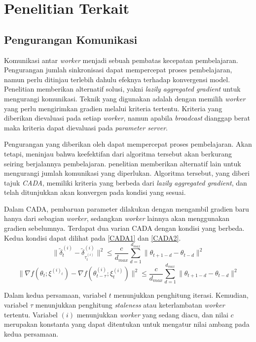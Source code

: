\section{Penelitian Terkait}

\subsection{Pengurangan Komunikasi}
Komunikasi antar \emph{worker} menjadi sebuah pembatas kecepatan pembelajaran. Pengurangan jumlah sinkronisasi dapat mempercepat proses pembelajaran, namun perlu ditinjau terlebih dahulu efeknya terhadap konvergensi model. Penelitian \textcite{Chen2018LAG} memberikan alternatif solusi, yakni \emph{lazily aggregated gradient} untuk mengurangi komunikasi. Teknik yang digunakan adalah dengan memilih \emph{worker} yang perlu mengirimkan gradien melalui kriteria tertentu. Kriteria yang diberikan dievaluasi pada setiap \emph{worker}, namun apabila \emph{broadcast} dianggap berat maka kriteria dapat dievaluasi pada \emph{parameter server}.

Pengurangan yang diberikan oleh \textcite{Chen2018LAG} dapat mempercepat proses pembelajaran. Akan tetapi, \textcite{Chen2021CADA} meninjau bahwa keefektifan dari algoritma tersebut akan berkurang seiring berjalannya pembelajaran. penelitian \textcite{Chen2021CADA} memberikan alternatif lain untuk mengurangi jumlah komunikasi yang diperlukan. Algoritma tersebut, yang diberi tajuk \emph{CADA}, memiliki kriteria yang berbeda dari \emph{lazily aggregated gradient}, dan telah ditunjukkan akan konvergen pada kondisi yang sesuai.

Dalam CADA, pembaruan parameter dilakukan dengan mengambil gradien baru hanya dari sebagian \emph{worker}, sedangkan \emph{worker} lainnya akan menggunakan gradien sebelumnya. Terdapat dua varian CADA dengan kondisi yang berbeda. Kedua kondisi dapat dilihat pada \autoref{CADA1} dan \autoref{CADA2}.
\begin{equation}
  \label{CADA1}
  \|\tilde{\delta}_t^{(i)} - \tilde{\delta}^{(i)}_{\tau_t^{(i)}}\|^2 \leq \frac{c}{d_{max}} \sum_{d=1}^{d_{max}} \|\theta_{t+1-d} - \theta_{t-d}\|^2
\end{equation}
\begin{equation}
  \label{CADA2}
  \|\nabla f(\theta_t;\xi^{(i)_t}) - \nabla f(\theta_{t-\tau}^{(i)};\xi_t^{(i)})\|^2 \leq \frac{c}{d_{max}} \sum_{d=1}^{d_{max}} \|\theta_{t+1-d} - \theta_{t-d}\|^2
\end{equation}

Dalam kedua persamaan, variabel $t$ menunjukkan penghitung iterasi. Kemudian, variabel $\tau$ menunjukkan penghitung \emph{staleness} atau keterlambatan \emph{worker} tertentu. Variabel $(i)$ menunjukkan \emph{worker} yang sedang diacu, dan nilai $c$ merupakan konstanta yang dapat ditentukan untuk mengatur nilai ambang pada kedua persamaan.

